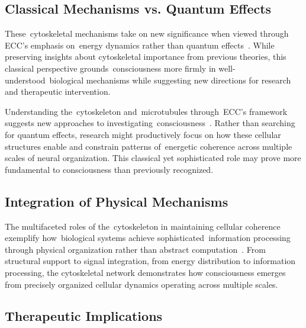 \subsection*{Classical Mechanisms vs. Quantum Effects~~}

These~cytoskeletal mechanisms take on new significance when viewed through ECC's emphasis on~energy dynamics rather than quantum effects~\cite{Fletcher2010, breakspear2005dynamics}. While preserving insights about cytoskeletal importance from previous theories, this classical perspective grounds~consciousness more firmly in well-understood~biological mechanisms while suggesting new directions for research and therapeutic intervention.

Understanding the~cytoskeleton and~microtubules through~ECC's framework suggests new approaches to investigating~consciousness~\cite{Fletcher2010, breakspear2005dynamics}. Rather than searching for quantum effects, research might productively focus on how these cellular structures enable and constrain patterns of~energetic coherence across multiple scales of neural organization. This classical yet sophisticated role may prove more fundamental to consciousness than previously recognized.

\subsection*{Integration of Physical Mechanisms~~}

The multifaceted roles of the~cytoskeleton in maintaining cellular coherence exemplify how~biological systems achieve sophisticated~information processing through physical organization rather than abstract computation~\cite{Fletcher2010, butlin2023consciousnessartificialintelligenceinsights}. From structural support to signal integration, from energy distribution to information processing, the cytoskeletal network demonstrates how consciousness emerges from precisely organized cellular dynamics operating across multiple scales.

\subsection*{Therapeutic Implications~~}


